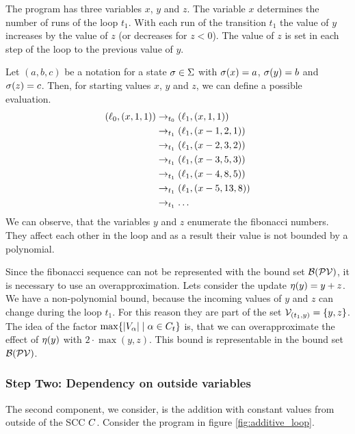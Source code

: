 

The program has three variables $x$, $y$ and $z$.
The variable $x$ determines the number of runs of the loop $t_1$.
With each run of the transition $t_1$ the value of $y$ increases by the value of $z$ (or decreases for $z < 0$).
The value of $z$ is set in each step of the loop to the previous value of $y$.

Let $(a,b,c)$ be a notation for a state $\sigma \in \Sigma$ with $\sigma(x) = a$, $\sigma(y) = b$ and $\sigma(z) = c$.
Then, for starting values $x$, $y$ and $z$, we can define a possible evaluation.
\begin{align*}
  (\ell_0, (x,1,1)) & \rightarrow_{t_0} (\ell_1, (x,1,1)) \\
  & \rightarrow_{t_1} (\ell_1, (x-1,2,1)) \\
  & \rightarrow_{t_1} (\ell_1, (x-2,3,2)) \\
  & \rightarrow_{t_1} (\ell_1, (x-3,5,3)) \\
  & \rightarrow_{t_1} (\ell_1, (x-4,8,5)) \\
  & \rightarrow_{t_1} (\ell_1, (x-5,13,8)) \\
  & \rightarrow_{t_1} \dots
\end{align*}
We can observe, that the variables $y$ and $z$ enumerate the fibonacci numbers.
They affect each other in the loop and as a result their value is not bounded by a polynomial.

Since the fibonacci sequence can not be represented with the bound set $\mathcal{B}(\mathcal{PV})$, it is necessary to use an overapproximation.
Lets consider the update $\eta(y) = y + z$.
We have a non-polynomial bound, because the incoming values of $y$ and $z$ can change during the loop $t_1$.
For this reason they are part of the set $\mathcal{V}_{(t_1,y)} = \lbrace y,z \rbrace$.
The idea of the factor $\max \lbrace \left|V_\alpha\right| \mid \alpha \in C_t \rbrace$ is, that we can overapproximate the effect of $\eta(y)$ with $2 \cdot \max(y,z)$.
This bound is representable in the bound set $\mathcal{B}(\mathcal{PV})$. 

\subsubsection{Step Two: Dependency on outside variables}

The second component, we consider, is the addition with constant values from outside of the SCC $C$.
Consider the program in figure \ref{fig:additive_loop}.

